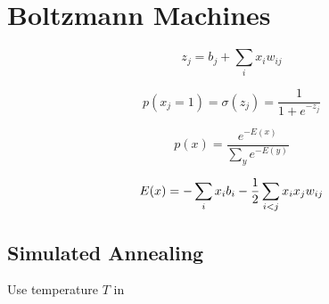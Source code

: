 \section{Boltzmann Machines}\label{sec:bm}

\begin{equation}
z_j = b_j + \sum_i x_i w_{ij}
\end{equation}

\begin{equation}
p(x_j = 1) = \sigma(z_j) = \frac{1}{1 + e^{-z_j}}
\end{equation}


\begin{equation}
p(x) = \frac{e^{-E(x)}}{\sum_y e^{-E(y)}}
\end{equation}

\begin{equation}
E(x) = - \sum_i x_i b_i - \frac{1}{2} \sum_{i<j} x_i x_j w_{ij}
\end{equation}

\subsection{Simulated Annealing}
Use temperature $T$ in 